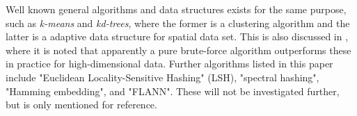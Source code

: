 Well known general algorithms and data structures exists for the same purpose, such as \textit{k-means} and \textit{kd-trees}, where the former is a clustering algorithm and the latter is a adaptive data structure for spatial data set. This is also discussed in \cite{schmid9}, where it is noted that apparently a pure brute-force algorithm outperforms these in practice for high-dimensional data. Further algorithms listed in this paper include "Euclidean Locality-Sensitive Hashing" (LSH), "spectral hashing", "Hamming embedding", and "FLANN". These will not be investigated further, but is only mentioned for reference.

